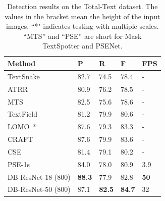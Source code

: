 \documentclass[letterpaper]{article} %
\begin{document}
\begin{table}[!ht]
\centering
\caption{Detection results on the Total-Text dataset. The values in the bracket mean the height of the input images. ``*" indicates testing with multiple scales. ``MTS'' and ``PSE'' are short for Mask TextSpotter and PSENet.}
\begin{tabularx}{1.0\linewidth}{@{}l*{4}X@{}}
\toprule
Method           & P    & R    & F    & FPS \\ \midrule
TextSnake~\cite{long2018textsnake}      & 82.7 & 74.5 & 78.4 & -   \\
ATRR~\cite{atrr}            & 80.9 & 76.2 & 78.5 & -   \\
MTS~\cite{lyu2018mask} & 82.5 & 75.6 & 78.6 & -   \\
TextField~\cite{xu2019textfield}        & 81.2 & 79.9 & 80.6 & -   \\
LOMO~\cite{lomo}*        & 87.6 & 79.3 & 83.3 & -   \\
CRAFT~\cite{craft}           & 87.6 & 79.9 & 83.6 & -   \\
CSE~\cite{cse}              & 81.4 & 79.1 & 80.2 & -   \\
PSE-1s~\cite{wang2019shape}        & 84.0   & 78.0   & 80.9 & 3.9 \\
\midrule
DB-ResNet-18 (800)   & \textbf{88.3} & 77.9 & 82.8 & \textbf{50}  \\
DB-ResNet-50 (800)  & 87.1 & \textbf{82.5} & \textbf{84.7} & 32  \\ \bottomrule
\end{tabularx}
\label{tab:totaltext}
\end{table}
\end{document}
